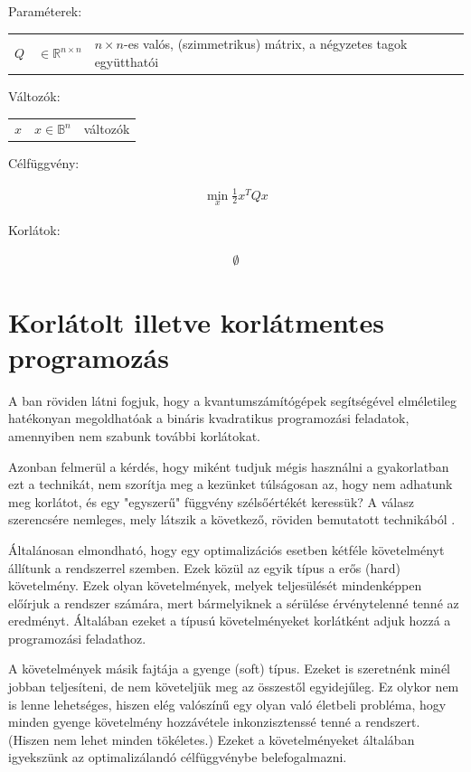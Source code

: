 Paraméterek:

\begin{tabular}{lll}
	$Q$ & $\in \mathbb{R}^{n×n}$  & $n × n$-es valós, (szimmetrikus) mátrix, a négyzetes tagok együtthatói \\
\end{tabular}

Változók:

\begin{tabular}{lll}
	$x$ & $x \in \mathbb{B}^n$ & változók \\
\end{tabular}

Célfüggvény:

\begin{align}
	\min_{x} \frac{1}{2} x^T Q x
\end{align}

Korlátok:

\begin{align}
	\emptyset
\end{align}



\section{Korlátolt illetve korlátmentes programozás} \label{sec:constrainedVSunconstrained}

A ban röviden látni fogjuk, hogy a kvantumszámítógépek segítségével elméletileg hatékonyan megoldhatóak a bináris kvadratikus programozási feladatok, amennyiben nem szabunk további korlátokat.

Azonban felmerül a kérdés, hogy miként tudjuk mégis használni a gyakorlatban ezt a technikát, nem szorítja meg a kezünket túlságosan az, hogy nem adhatunk meg korlátot, és egy "egyszerű" függvény szélsőértékét keressük? A válasz szerencsére nemleges, mely látszik a következő, röviden bemutatott technikából \cite{DBLP:journals/corr/abs-1811-11538}. 

Általánosan elmondható, hogy egy optimalizációs esetben kétféle követelményt állítunk a rendszerrel szemben. Ezek közül az egyik típus a erős (hard) követelmény. Ezek olyan követelmények, melyek teljesülését mindenképpen előírjuk a rendszer számára, mert bármelyiknek a sérülése érvénytelenné tenné az eredményt. Általában ezeket a típusú követelményeket korlátként adjuk hozzá a programozási feladathoz.

A követelmények másik fajtája a gyenge (soft) típus. Ezeket is szeretnénk minél jobban teljesíteni, de nem követeljük meg az összestől egyidejűleg. Ez olykor nem is lenne lehetséges, hiszen elég valószínű egy olyan való életbeli probléma, hogy minden gyenge követelmény hozzávétele inkonzisztenssé tenné a rendszert. (Hiszen nem lehet minden tökéletes.) Ezeket a követelményeket általában igyekszünk az optimalizálandó célfüggvénybe belefogalmazni.


